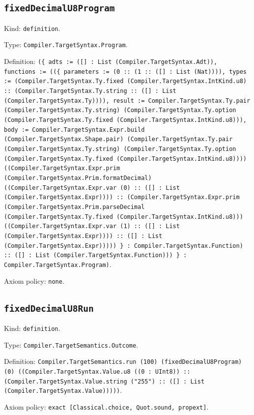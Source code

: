 \documentclass[11pt]{article}
\begin{document}
\subsection*{\texttt{fixedDecimalU8Program}}
\noindent Kind: \texttt{definition}.\par
\noindent Type: \texttt{Compiler.TargetSyntax.Program}.\par
\noindent Definition: \texttt{(\{ adts := ([] : List (Compiler.TargetSyntax.Adt)), functions := ((\{ parameters := (0 :: (1 :: ([] : List (Nat)))), types := (Compiler.TargetSyntax.Ty.fixed (Compiler.TargetSyntax.IntKind.u8) :: (Compiler.TargetSyntax.Ty.string :: ([] : List (Compiler.TargetSyntax.Ty)))), result := Compiler.TargetSyntax.Ty.pair (Compiler.TargetSyntax.Ty.string) (Compiler.TargetSyntax.Ty.option (Compiler.TargetSyntax.Ty.fixed (Compiler.TargetSyntax.IntKind.u8))), body := Compiler.TargetSyntax.Expr.build (Compiler.TargetSyntax.Shape.pair) (Compiler.TargetSyntax.Ty.pair (Compiler.TargetSyntax.Ty.string) (Compiler.TargetSyntax.Ty.option (Compiler.TargetSyntax.Ty.fixed (Compiler.TargetSyntax.IntKind.u8)))) ((Compiler.TargetSyntax.Expr.prim (Compiler.TargetSyntax.Prim.formatDecimal) ((Compiler.TargetSyntax.Expr.var (0) :: ([] : List (Compiler.TargetSyntax.Expr)))) :: (Compiler.TargetSyntax.Expr.prim (Compiler.TargetSyntax.Prim.parseDecimal (Compiler.TargetSyntax.Ty.fixed (Compiler.TargetSyntax.IntKind.u8))) ((Compiler.TargetSyntax.Expr.var (1) :: ([] : List (Compiler.TargetSyntax.Expr)))) :: ([] : List (Compiler.TargetSyntax.Expr))))) \} : Compiler.TargetSyntax.Function) :: ([] : List (Compiler.TargetSyntax.Function))) \} : Compiler.TargetSyntax.Program)}.\par
\noindent Axiom policy: \texttt{none}.\par
\subsection*{\texttt{fixedDecimalU8Run}}
\noindent Kind: \texttt{definition}.\par
\noindent Type: \texttt{Compiler.TargetSemantics.Outcome}.\par
\noindent Definition: \texttt{Compiler.TargetSemantics.run (100) (fixedDecimalU8Program) (0) ((Compiler.TargetSyntax.Value.u8 ((0 : UInt8)) :: (Compiler.TargetSyntax.Value.string ("255") :: ([] : List (Compiler.TargetSyntax.Value)))))}.\par
\noindent Axiom policy: \texttt{exact [Classical.choice, Quot.sound, propext]}.\par
\end{document}
